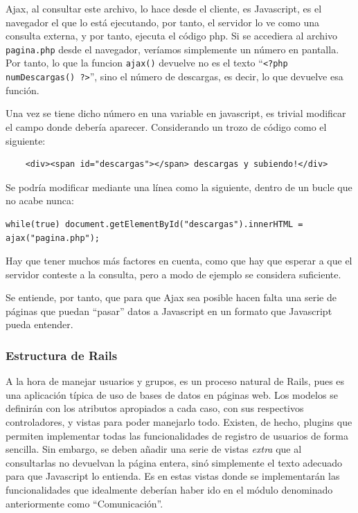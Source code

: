 Ajax, al consultar este archivo, lo hace desde el cliente, es Javascript, es el navegador el que lo está ejecutando, por tanto, el servidor lo ve como una consulta externa, y por tanto, ejecuta el código php. Si se accediera al archivo \texttt{pagina.php} desde el navegador, veríamos simplemente un número en pantalla. Por tanto, lo que la funcion \texttt{ajax()} devuelve no es el texto ``\texttt{<?php numDescargas() ?>}'', sino el número de descargas, es decir, lo que devuelve esa función.

Una vez se tiene dicho número en una variable en javascript, es trivial modificar el campo donde debería aparecer. Considerando un trozo de código como el siguiente:

\begin{verbatim}
	<div><span id="descargas"></span> descargas y subiendo!</div>
\end{verbatim}

Se podría modificar mediante una línea como la siguiente, dentro de un bucle que no acabe nunca:

\begin{verbatim}
while(true)	document.getElementById("descargas").innerHTML = ajax("pagina.php");
\end{verbatim}

Hay que tener muchos más factores en cuenta, como que hay que esperar a que el servidor conteste a la consulta, pero a modo de ejemplo se considera suficiente.

Se entiende, por tanto, que para que Ajax sea posible hacen falta una serie de páginas que puedan ``pasar'' datos a Javascript en un formato que Javascript pueda entender. 

\subsubsection{Estructura de Rails}
A la hora de manejar usuarios y grupos, es un proceso natural de Rails, pues es una aplicación típica de uso de bases de datos en páginas web. Los modelos se definirán con los atributos apropiados a cada caso, con sus respectivos controladores, y vistas para poder manejarlo todo. Existen, de hecho, plugins que permiten implementar todas las funcionalidades de registro de usuarios de forma sencilla. Sin embargo, se deben añadir una serie de vistas \emph{extra} que al consultarlas no devuelvan la página entera, sinó simplemente el texto adecuado para que Javascript lo entienda. Es en estas vistas donde se implementarán las funcionalidades que idealmente deberían haber ido en el módulo denominado anteriormente como ``Comunicación''.

